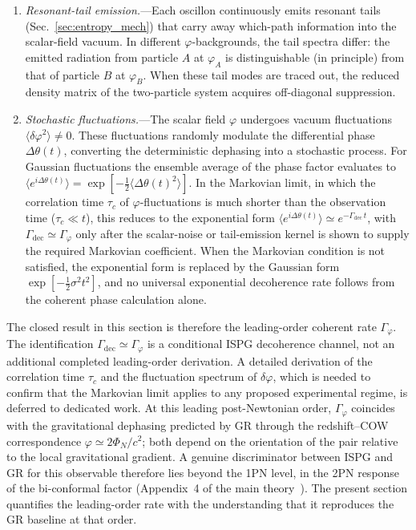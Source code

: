 \documentclass[aps,prd,onecolumn,superscriptaddress,nofootinbib,showpacs,12pt,notitlepage]{revtex4-2}
\begin{document}
\begin{enumerate}
  \item \textit{Resonant-tail emission.}---Each oscillon
    continuously emits resonant tails
    (Sec.~\ref{sec:entropy_mech}) that carry away
    which-path information into the scalar-field vacuum.
    In different $\varphi$-backgrounds, the tail spectra
    differ: the emitted radiation from particle $A$ at
    $\varphi_{A}$ is distinguishable (in principle) from
    that of particle $B$ at $\varphi_{B}$.  When these
    tail modes are traced out, the reduced density matrix
    of the two-particle system acquires off-diagonal
    suppression.
  \item \textit{Stochastic fluctuations.}---The scalar
    field $\varphi$ undergoes vacuum fluctuations
    $\langle\delta\varphi^{2}\rangle \neq 0$.  These
    fluctuations randomly modulate the differential phase
    $\Delta\theta(t)$, converting the deterministic
    dephasing into a stochastic process.  For Gaussian
    fluctuations the ensemble average of the phase
    factor evaluates to
    $\langle e^{i\Delta\theta(t)}\rangle
    = \exp\!\left[-\tfrac12\langle\Delta\theta(t)^{2}\rangle
    \right]$.  In the Markovian limit, in which the
    correlation time $\tau_{c}$ of $\varphi$-fluctuations
    is much shorter than the observation time
    ($\tau_{c}\ll t$), this reduces to the exponential
    form
    $\langle e^{i\Delta\theta(t)}\rangle
    \simeq e^{-\Gamma_{\mathrm{dec}}\,t}$,
    with $\Gamma_{\mathrm{dec}}\simeq\Gamma_{\varphi}$
    only after the scalar-noise or tail-emission kernel is
    shown to supply the required Markovian coefficient.  When
    the Markovian condition is not satisfied, the
    exponential form is replaced by the Gaussian form
    $\exp[-\tfrac12\sigma^{2}t^{2}]$, and no universal
    exponential decoherence rate follows from the coherent
    phase calculation alone.
\end{enumerate}

The closed result in this section is therefore the
leading-order coherent rate $\Gamma_{\varphi}$.  The
identification $\Gamma_{\mathrm{dec}}\simeq\Gamma_{\varphi}$
is a conditional ISPG decoherence channel, not an additional
completed leading-order derivation.  A detailed derivation of
the correlation time $\tau_{c}$ and the fluctuation spectrum
of $\delta\varphi$, which is needed to confirm that the
Markovian limit applies to any proposed experimental regime,
is deferred to dedicated work.  At this leading
post-Newtonian order, $\Gamma_{\varphi}$ coincides with the
gravitational dephasing predicted by GR through the
redshift--COW correspondence
$\varphi \simeq 2\Phi_N/c^2$; both depend on the
orientation of the pair relative to the local
gravitational gradient.  A genuine discriminator between
ISPG and GR for this observable therefore lies beyond the
1PN level, in the 2PN response of the bi-conformal factor
(Appendix~4 of the main
theory~\cite{Lotishvili2026}).  The present section
quantifies the leading-order rate with the understanding
that it reproduces the GR baseline at that order.
\end{document}
